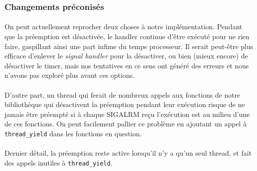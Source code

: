 \subsubsection{Changements préconisés}

\paragraph{}
On peut actuellement reprocher deux choses à notre implémentation.
Pendant que la préemption est désactivée, le handler continue d'être exécuté pour ne rien faire, gaspillant ainsi une part infime du temps processeur. Il serait peut-être plus efficace d'enlever le \textit{signal handler} pour la désactiver, ou bien (mieux encore) de désactiver le timer, mais nos tentatives en ce sens ont généré des erreurs et nous n'avons pas exploré plus avant ces options.

\paragraph{}
D'autre part, un thread qui ferait de nombreux appels aux fonctions de notre bibliothèque qui désactivent la préemption pendant leur exécution risque de ne jamais être préempté si à chaque SIGALRM reçu l'exécution est au milieu d'une de ces fonctions.
On peut facilement pallier ce problème en ajoutant un appel à \texttt{thread\_yield} dans les fonctions en question.

\paragraph{}
Dernier détail, la préemption reste active lorsqu'il n'y a qu'un seul thread, et fait des appels inutiles à \texttt{thread\_yield}.


